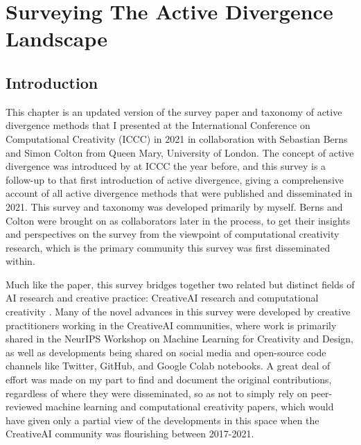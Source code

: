\chapter{Surveying The Active Divergence Landscape}
\label{ch:active_div}

\section{Introduction}

This chapter is an updated version of the survey paper and taxonomy of active divergence methods that I presented at the International Conference on Computational Creativity (ICCC) in 2021 \citep{broad2021active} in collaboration with Sebastian Berns and Simon Colton from Queen Mary, University of London. 
The concept of active divergence was introduced by \cite{berns2020bridging} at ICCC the year before, and this survey is a follow-up to that first introduction of active divergence, giving a comprehensive account of all active divergence methods that were published and disseminated in 2021. 
This survey and taxonomy was developed primarily by myself. 
Berns and Colton were brought on as collaborators later in the process, to get their insights and perspectives on the survey from the viewpoint of computational creativity research, which is the primary community this survey was first disseminated within.

Much like the \cite{berns2020bridging} paper, this survey bridges together two related but distinct fields of AI research and creative practice: CreativeAI research and computational creativity \citep{cook2018neighbouring}.
Many of the novel advances in this survey were developed by creative practitioners working in the CreativeAI communities, where work is primarily shared in the NeurIPS Workshop on Machine Learning for Creativity and Design, as well as developments being shared on social media and open-source code channels like Twitter, GitHub, and Google Colab notebooks. 
A great deal of effort was made on my part to find and document the original contributions, regardless of where they were disseminated, so as not to simply rely on peer-reviewed machine learning and computational creativity papers, which would have given only a partial view of the developments in this space when the CreativeAI community was flourishing between 2017-2021.

